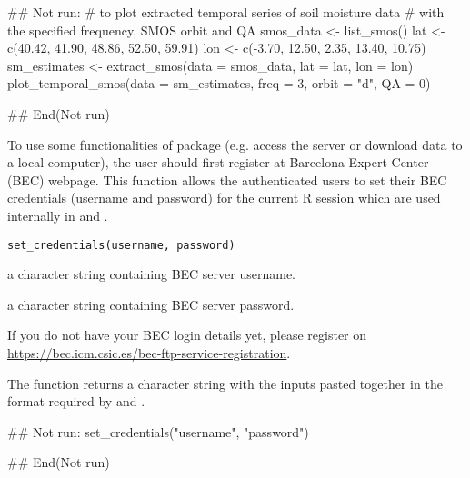 \documentclass[a4paper]{book}
\begin{document}
%
\begin{Examples}
\begin{ExampleCode}
## Not run: 
# to plot extracted temporal series of soil moisture data
# with the specified frequency, SMOS orbit and QA
smos_data <- list_smos()
lat <- c(40.42, 41.90, 48.86, 52.50, 59.91)
lon <- c(-3.70, 12.50, 2.35, 13.40, 10.75)
sm_estimates <- extract_smos(data = smos_data, lat = lat, lon = lon)
plot_temporal_smos(data = sm_estimates, freq = 3, orbit = "d", QA = 0)

## End(Not run)

\end{ExampleCode}
\end{Examples}
%
\begin{Description}
To use some functionalities of  package (e.g. access the server
or download data to a local computer), the user should first register at
Barcelona Expert Center (BEC) webpage. This function allows the authenticated
users to set their BEC credentials (username and password) for the current R
session which are used internally in 
and .
\end{Description}
%
\begin{Usage}
\begin{verbatim}
set_credentials(username, password)
\end{verbatim}
\end{Usage}
%
\begin{Arguments}
\begin{ldescription}
\item[\code{username}] a character string containing BEC server username.

\item[\code{password}] a character string containing BEC server password.
\end{ldescription}
\end{Arguments}
%
\begin{Details}
If you do not have your BEC login details yet, please register on
\url{https://bec.icm.csic.es/bec-ftp-service-registration}.
\end{Details}
%
\begin{Value}
The function returns a character string with the inputs pasted
together in the format required by 
and .
\end{Value}
%
\begin{Examples}
\begin{ExampleCode}
## Not run: 
set_credentials("username", "password")

## End(Not run)

\end{ExampleCode}
\end{Examples}
\printindex{}
\end{document}
